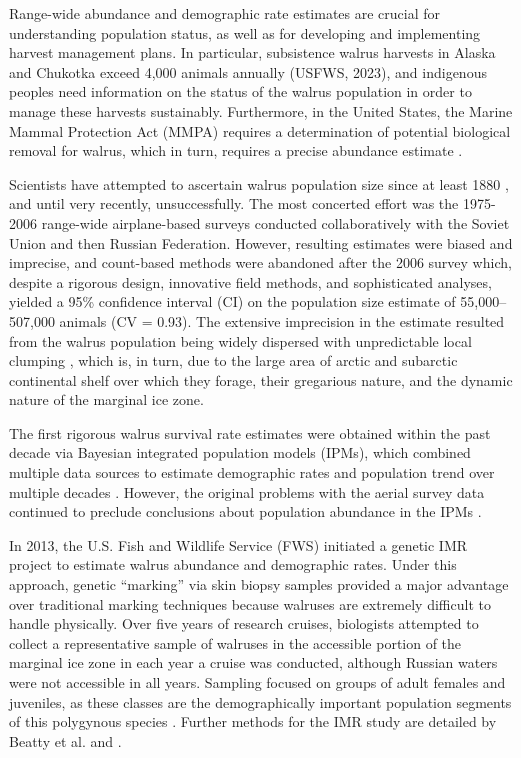 Range-wide abundance and demographic rate estimates are crucial for
understanding population status, as well as for developing and implementing
harvest management plans. In particular, subsistence walrus harvests
in Alaska and Chukotka exceed 4,000 animals annually (USFWS, 2023),
and indigenous peoples need information on the status of the walrus
population in order to manage these harvests sustainably. Furthermore,
in the United States, the Marine Mammal Protection Act (MMPA) requires
a determination of potential biological removal for walrus, which
in turn, requires a precise abundance estimate \citep{gilbert_review_1999,wade_determining_1999}.

Scientists have attempted to ascertain walrus population size since
at least 1880 \citep{fay_managing_1989}, and until very recently,
unsuccessfully. The most concerted effort was the 1975-2006 range-wide
airplane-based surveys conducted collaboratively with the Soviet Union
and then Russian Federation. However, resulting estimates were biased
and imprecise, and count-based methods were abandoned after the 2006
survey which, despite a rigorous design, innovative field methods,
and sophisticated analyses, yielded a 95\% confidence interval (CI)
on the population size estimate of 55,000–507,000 animals (CV = 0.93).
The extensive imprecision in the estimate resulted from the walrus
population being widely dispersed with unpredictable local clumping
\citep{speckman_results_2011,jay_walrus_2012}, which is, in turn,
due to the large area of arctic and subarctic continental shelf over
which they forage, their gregarious nature, and the dynamic nature
of the marginal ice zone.

The first rigorous walrus survival rate estimates were obtained within
the past decade via Bayesian integrated population models (IPMs),
which combined multiple data sources to estimate demographic rates
and population trend over multiple decades \citep{taylor_demography_2015,taylor_demography_2018}.
However, the original problems with the aerial survey data continued
to preclude conclusions about population abundance in the IPMs \citep{taylor_demography_2015}.

In 2013, the U.S. Fish and Wildlife Service (FWS) initiated a genetic
IMR project to estimate walrus abundance and demographic rates. Under
this approach, genetic ``marking'' via skin biopsy samples \citep{palsboll_genetic_1997}
provided a major advantage over traditional marking techniques because
walruses are extremely difficult to handle physically. Over five years
of research cruises, biologists attempted to collect a representative
sample of walruses in the accessible portion of the marginal ice zone
in each year a cruise was conducted, although Russian waters were
not accessible in all years. Sampling focused on groups of adult females
and juveniles, as these classes are the demographically important
population segments of this polygynous species \citep{fay_ecology_1982}.
Further methods for the IMR study are detailed by Beatty et al. \citet{beatty_panmixia_2020}
and \citet{beatty_estimating_2022}.


